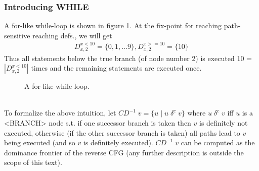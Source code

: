 \documentclass[a4paper]{article}
\newcommand{\NL}[0]{ \hfill\\\noindent }
\begin{document}

\subsubsection{Introducing WHILE}
A for-like while-loop is shown in figure \ref{forwhile}. At the fix-point for reaching path-sensitive reaching defs., we will get
\begin{align*}
D_{x,2}^{x < 10} = \{0,1,\ldots 9 \}, D_{x,2}^{x >= 10} = \{ 10 \}
\end{align*}
\noindent
Thus all statements below the true branch (of node number 2) is executed 10 = $|D_{x,2}^{x < 10}|$ times and the remaining statements are executed once.
\begin{figure}[ht!]
	\centering	
	\scalebox{.6}{}
	\caption{ A for-like while loop. }
	\label{forwhile}
\end{figure}
\noindent


\NL
To formalize the above intuition, let $CD^{-1}\;v = \{ u\;|\;u\;\delta^c\;v  \}$ where $u\;\delta^c\;v$ iff $u$ is a <BRANCH> node s.t. if one successor branch is taken then $v$ is definitely not executed, otherwise (if the other successor branch is taken) all paths lead to $v$ being executed (and so $v$ is definitely executed). $CD^{-1}\;v$ can be computed as the dominance frontier of the reverse CFG (any further description is outside the scope of this text).
\end{document}
